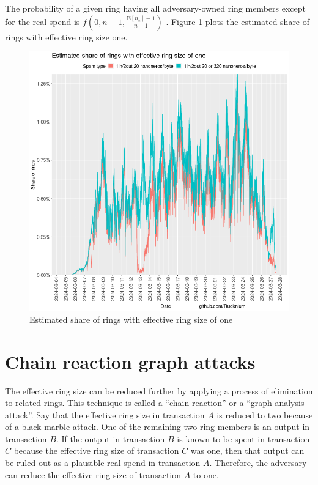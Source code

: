 \documentclass[usletter,11pt,english,openany]{article}
\begin{document}
The probability of a given ring having all adversary-owned ring members
except for the real spend is $f\left(0,n-1,\frac{\mathrm{E}\left[n_{e}\right]-1}{n-1}\right)$
. Figure \ref{fig-share-ring-size-one} plots the estimated share
of rings with effective ring size one.

\begin{figure}[H]
\caption{Estimated share of rings with effective ring size of one}
\label{fig-share-ring-size-one}
\centering{}\includegraphics[scale=0.5]{images/empirical-ring-size-one}
\end{figure}


\section{Chain reaction graph attacks}

The effective ring size can be reduced further by applying a process
of elimination to related rings. This technique is called a ``chain
reaction'' or a ``graph analysis attack''. Say that the effective
ring size in transaction $A$ is reduced to two because of a black
marble attack. One of the remaining two ring members is an output
in transaction $B$. If the output in transaction $B$ is known to
be spent in transaction $C$ because the effective ring size of transaction
$C$ was one, then that output can be ruled out as a plausible real
spend in transaction $A$. Therefore, the adversary can reduce the
effective ring size of transaction $A$ to one.
\end{document}
